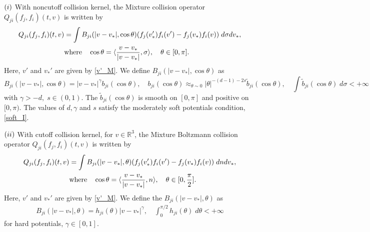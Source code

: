 \documentclass[reqno,10pt]{amsart}
\numberwithin{equation}{section}
\begin{document}
$(\lowercase\expandafter{\romannumeral1})$ With noncutoff collision kernel, the Mixture collision operator $Q_{ji}(f_j, f_i) (t,v)$ is written by  
\begin{align} \label{Q_nc_M}
    Q_{ji}(f_j, f_i) (t,v) &= \int B_{ji}(|v-v_*|, \cos \theta)(f_j(v_*')f_i(v')-f_j(v_*)f_i(v)) \; d\sigma dv_*, \notag \\ \quad &\text{where} \quad \cos\theta = \langle\frac{v-v_*}{|v-v_*|}, \sigma\rangle, \quad \theta \in [0, \pi].
\end{align} Here, $v'$ and $v_*'$ are given by \eqref{v'_M}.
We define $B_{ji}(|v-v_*|,\cos \theta )$ as
\begin{equation} \label{B_nc_M}
    B_{ji}(|v-v_*|,\cos \theta)=|v-v_*|^{\gamma}b_{ji}(\cos\theta), \quad b_{ji}(\cos\theta) \approx_{\theta \sim 0} |\theta|^{-(d-1)-2s} \tilde{b}_{ji}(\cos\theta), \quad
    \int  \tilde{b}_{ji}(\cos\theta) \;d\sigma < +\infty
\end{equation} with $\gamma>-d,\;s\in(0,1).$ The $\tilde{b}_{ji}(\cos\theta)$ is smooth on $[0,\pi]$ and positive on $[0,\pi).$
The values of $d, \gamma$ and $s$ satisfy the moderately soft potentials condition, \eqref{soft_I}. \vspace{3mm}

$(\lowercase\expandafter{\romannumeral2})$ With cutoff collision kernel, for $v \in \mathbb{R}^3$, the Mixture Boltzmann collision operator $Q_{ji}(f_j,f_i)(t,v)$ is written by 
\begin{align} \label{Q_c_M}
   Q_{ji}(f_j, f_i) (t,v) &= \int B_{ji}(|v-v_*|, \theta)(f_j(v_*')f_i(v')-f_j(v_*)f_i(v)) \; dn dv_*, \notag \\ \quad &\text{where} \quad \cos\theta = \langle\frac{v-v_*}{|v-v_*|}, n\rangle, \quad \theta \in [0, \frac{\pi}{2}].
\end{align} Here, $v'$ and $v_*'$ are given by \eqref{v'_M}. We define the $B_{ji}(|v-v_*|, \theta)$ as
\begin{align}  \label{B_c_M}
 B_{ji}(|v-v_*|,\theta) = h_{ji}(\theta)|v-v_*|^\gamma ,\quad \int_0^{\pi/2}h_{ji}(\theta) \;d\theta < +\infty 
\end{align} for hard potentials, $\gamma \in [0,1].$ \vspace{7mm}
\end{document}
